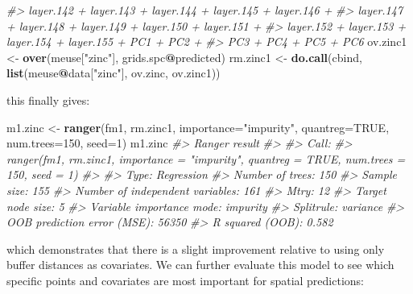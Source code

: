 \documentclass[graybox,natbib,nospthms,UStrade]{svmono}
\newenvironment{Shaded}{\begin{snugshade}}{\end{snugshade}}
\newcommand{\CommentTok}[1]{\textcolor[rgb]{0.37,0.37,0.37}{\textit{#1}}}
\newcommand{\DataTypeTok}[1]{\textcolor[rgb]{0.27,0.27,0.27}{#1}}
\newcommand{\DecValTok}[1]{\textcolor[rgb]{0.06,0.06,0.06}{#1}}
\newcommand{\KeywordTok}[1]{\textcolor[rgb]{0.27,0.27,0.27}{\textbf{#1}}}
\newcommand{\NormalTok}[1]{#1}
\newcommand{\OperatorTok}[1]{\textcolor[rgb]{0.43,0.43,0.43}{\textbf{#1}}}
\newcommand{\OtherTok}[1]{\textcolor[rgb]{0.37,0.37,0.37}{#1}}
\newcommand{\StringTok}[1]{\textcolor[rgb]{0.5,0.5,0.5}{#1}}
\begin{document}
\begin{Shaded}
\begin{Highlighting}[]
\CommentTok{#>     layer.142 + layer.143 + layer.144 + layer.145 + layer.146 + }
\CommentTok{#>     layer.147 + layer.148 + layer.149 + layer.150 + layer.151 + }
\CommentTok{#>     layer.152 + layer.153 + layer.154 + layer.155 + PC1 + PC2 + }
\CommentTok{#>     PC3 + PC4 + PC5 + PC6}
\NormalTok{ov.zinc1 <-}\StringTok{ }\KeywordTok{over}\NormalTok{(meuse[}\StringTok{"zinc"}\NormalTok{], grids.spc}\OperatorTok{@}\NormalTok{predicted)}
\NormalTok{rm.zinc1 <-}\StringTok{ }\KeywordTok{do.call}\NormalTok{(cbind, }\KeywordTok{list}\NormalTok{(meuse}\OperatorTok{@}\NormalTok{data[}\StringTok{"zinc"}\NormalTok{], ov.zinc, ov.zinc1))}
\end{Highlighting}
\end{Shaded}

this finally gives:

\begin{Shaded}
\begin{Highlighting}[]
\NormalTok{m1.zinc <-}\StringTok{ }\KeywordTok{ranger}\NormalTok{(fm1, rm.zinc1, }\DataTypeTok{importance=}\StringTok{"impurity"}\NormalTok{, }
                  \DataTypeTok{quantreg=}\OtherTok{TRUE}\NormalTok{, }\DataTypeTok{num.trees=}\DecValTok{150}\NormalTok{, }\DataTypeTok{seed=}\DecValTok{1}\NormalTok{)}
\NormalTok{m1.zinc}
\CommentTok{#> Ranger result}
\CommentTok{#> }
\CommentTok{#> Call:}
\CommentTok{#>  ranger(fm1, rm.zinc1, importance = "impurity", quantreg = TRUE,      num.trees = 150, seed = 1) }
\CommentTok{#> }
\CommentTok{#> Type:                             Regression }
\CommentTok{#> Number of trees:                  150 }
\CommentTok{#> Sample size:                      155 }
\CommentTok{#> Number of independent variables:  161 }
\CommentTok{#> Mtry:                             12 }
\CommentTok{#> Target node size:                 5 }
\CommentTok{#> Variable importance mode:         impurity }
\CommentTok{#> Splitrule:                        variance }
\CommentTok{#> OOB prediction error (MSE):       56350 }
\CommentTok{#> R squared (OOB):                  0.582}
\end{Highlighting}
\end{Shaded}

which demonstrates that there is a slight improvement relative to using only buffer distances as covariates.
We can further evaluate this model to see which specific points and covariates are
most important for spatial predictions:
\end{document}
